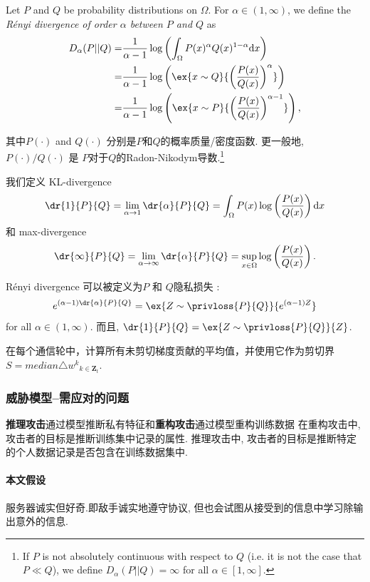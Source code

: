 \begin{definition}[{R\'enyi Divergence ]{ }}]
    Let $P$ and $Q$ be probability distributions on $\Omega$. For $\alpha \in  (1,\infty)$, we define the \emph{R\'enyi divergence of order $\alpha$ between $P$ and $Q$} as 
    \begin{align*}
    D_\alpha (P||Q)
     =& \frac{1}{\alpha - 1} \log \left( \int_\Omega P(x)^\alpha Q(x)^{1-\alpha} \mathrm{d} x \right) \\
     =& \frac{1}{\alpha-1} \log \left( \ex{x \sim Q}{ \left(\frac{P(x)}{Q(x)}\right)^\alpha} \right) \\
     =& \frac{1}{\alpha-1} \log \left( \ex{x \sim P}{ \left(\frac{P(x)}{Q(x)}\right)^{\alpha-1}} \right),
    \end{align*}


其中$P(\cdot)$ and $Q(\cdot)$ 分别是$P$和$Q$的概率质量/密度函数. 更一般地, $P(\cdot)/Q(\cdot)$ 是  $P$对于$Q$的Radon-Nikodym导数.\footnote{If $P$ is not absolutely continuous with respect to $Q$ (i.e. it is not the case that $P \ll Q$), we define $D_{\alpha}({P}||{Q})=\infty$ for all $\alpha \in [1,\infty]$.}

 
我们定义 KL-divergence $$\dr{1}{P}{Q} = \lim_{\alpha \to 1} \dr{\alpha}{P}{Q} = \int_\Omega P(x) \log \left(\frac{P(x)}{Q(x)}\right) \mathrm{d}x$$ 和 max-divergence $$\dr{\infty}{P}{Q} = \lim_{\alpha \to \infty} \dr{\alpha}{P}{Q} = \sup_{x \in \Omega} \log \left(\frac{P(x)}{Q(x)}\right) .$$

 R\'enyi divergence 可以被定义为$P$ 和 $Q$隐私损失  : $$e^{(\alpha-1)\dr{\alpha}{P}{Q}} = \ex{Z\sim\privloss{P}{Q}}{e^{(\alpha-1)Z}}$$ for all $\alpha \in (1,\infty)$. 而且, $\dr{1}{P}{Q} = \ex{Z\sim\privloss{P}{Q}}{Z}$.

    \end{definition}



在每个通信轮中，计算所有未剪切梯度贡献的平均值，并使用它作为剪切界$S=median{\triangle w^k}_{k \in \mathbf{Z}_t}$. 

\subsubsection{威胁模型--需应对的问题}
\textbf{推理攻击}通过模型推断私有特征和\textbf{重构攻击}通过模型重构训练数据
在重构攻击中, 攻击者的目标是推断训练集中记录的属性. 
推理攻击中, 攻击者的目标是推断特定的个人数据记录是否包含在训练数据集中. 
\paragraph{本文假设}服务器诚实但好奇.即敌手诚实地遵守协议, 但也会试图从接受到的信息中学习除输出意外的信息. 

